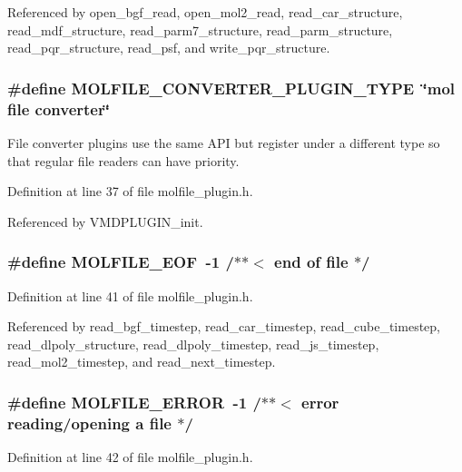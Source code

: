 Referenced by open\_\-bgf\_\-read, open\_\-mol2\_\-read, read\_\-car\_\-structure, read\_\-mdf\_\-structure, read\_\-parm7\_\-structure, read\_\-parm\_\-structure, read\_\-pqr\_\-structure, read\_\-psf, and write\_\-pqr\_\-structure.
\subsubsection{\setlength{\rightskip}{0pt plus 5cm}\#define MOLFILE\_\-CONVERTER\_\-PLUGIN\_\-TYPE\ \char`\"{}mol file converter\char`\"{}}\label{molfile__plugin_8h_a1}


File converter plugins use the same API but register under a different type so that regular file readers can have priority. 

Definition at line 37 of file molfile\_\-plugin.h.

Referenced by VMDPLUGIN\_\-init.
\subsubsection{\setlength{\rightskip}{0pt plus 5cm}\#define MOLFILE\_\-EOF\ -1   /$\ast$$\ast$$<$ end of file                    $\ast$/}\label{molfile__plugin_8h_a3}




Definition at line 41 of file molfile\_\-plugin.h.

Referenced by read\_\-bgf\_\-timestep, read\_\-car\_\-timestep, read\_\-cube\_\-timestep, read\_\-dlpoly\_\-structure, read\_\-dlpoly\_\-timestep, read\_\-js\_\-timestep, read\_\-mol2\_\-timestep, and read\_\-next\_\-timestep.
\subsubsection{\setlength{\rightskip}{0pt plus 5cm}\#define MOLFILE\_\-ERROR\ -1   /$\ast$$\ast$$<$ error reading/opening a file   $\ast$/}\label{molfile__plugin_8h_a4}




Definition at line 42 of file molfile\_\-plugin.h.

